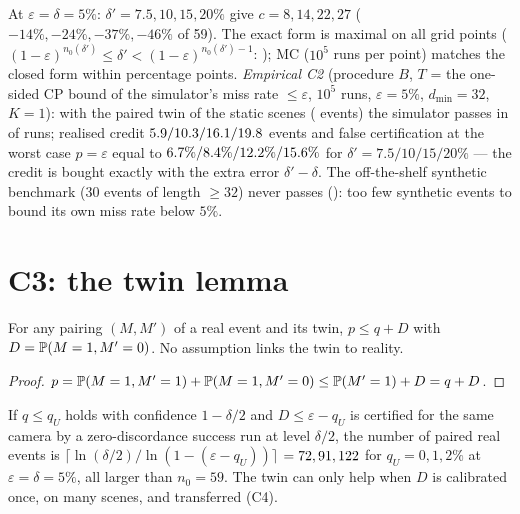 \begin{remark}
At $\varepsilon=\delta=5\%$: $\delta'=7.5,10,15,20\%$ give $c=8,14,22,27$ ($-14\%,-24\%,-37\%,-46\%$ of 59).
The exact form is maximal on all \numCtwoNgrid{} grid points ($(1-\varepsilon)^{n_0(\delta')}\le\delta'<(1-\varepsilon)^{n_0(\delta')-1}$:
\numCtwoAllMax); MC ($10^5$ runs per point) matches the closed form within \numCtwoMaxDev{} percentage points.
\emph{Empirical C2} (procedure $B$, $T$ = the one-sided CP bound of the simulator's miss rate $\le\varepsilon$,
$10^5$ runs, $\varepsilon=5\%$, $d_{\min}=32$, $K=1$): with the paired twin of the \numPopM{} static scenes (\numCtwoTwinN{} events) the
simulator passes in \numCtwoTwinPass{} of runs; realised credit $5.9/10.3/16.1/19.8$
events and false certification at the worst case $p=\varepsilon$ equal to
$6.7\%/8.4\%/12.2\%/15.6\%$ for $\delta'=7.5/10/15/20\%$ --- the credit is bought exactly with
the extra error $\delta'-\delta$. The off-the-shelf synthetic benchmark (30 events of length $\ge 32$) never passes
(\numCtwoBMCPass): too few synthetic events to bound its own miss rate below $5\%$.
\end{remark}

\section{C3: the twin lemma}

\begin{lemma}[C3]\label{lem:c3}
For any pairing $(M,M')$ of a real event and its twin, $p\le q+D$ with $D=\mathbb{P}(M=1,M'=0)$. No assumption links the
twin to reality.
\end{lemma}

\begin{proof}
$p=\mathbb{P}(M=1,M'=1)+\mathbb{P}(M=1,M'=0)\le\mathbb{P}(M'=1)+D=q+D$.
\end{proof}

\begin{corollary}
If $q\le q_U$ holds with confidence $1-\delta/2$ and $D\le\varepsilon-q_U$ is certified for the same camera by a
zero-discordance success run at level $\delta/2$, the number of paired real events is
$\lceil\ln(\delta/2)/\ln(1-(\varepsilon-q_U))\rceil$ $=72,91,122$ for $q_U=0,1,2\%$ at
$\varepsilon=\delta=5\%$, all larger than $n_0=59$. The twin can only help when $D$ is calibrated once, on many
scenes, and transferred (C4).
\end{corollary}

